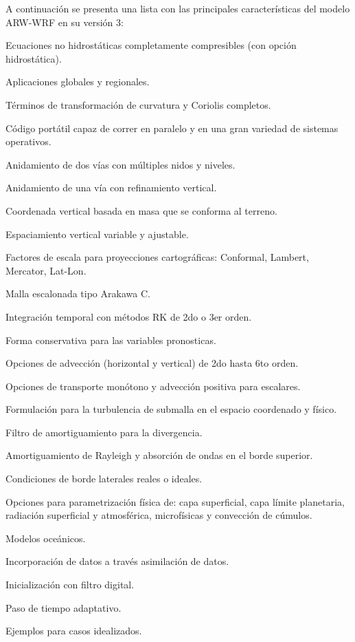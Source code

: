 A continuación se presenta una lista con las principales características del modelo ARW-WRF en su versión 3:
\begin{itemize*}
	\item Ecuaciones no hidrostáticas completamente compresibles (con opción hidrostática).
	\item Aplicaciones globales y regionales.
	\item Términos de transformación de curvatura y Coriolis completos.
	\item Código portátil capaz de correr en paralelo y en una gran variedad de sistemas operativos.
	\item Anidamiento de dos vías con múltiples nidos y niveles.
	\item Anidamiento de una vía con refinamiento vertical.
	\item Coordenada vertical basada en masa que se conforma al terreno.
	\item Espaciamiento vertical variable y ajustable.
	\item Factores de escala para proyecciones cartográficas: Conformal, Lambert, Mercator, Lat-Lon.
	\item Malla escalonada tipo Arakawa C.
	\item Integración temporal con métodos RK de 2do o 3er orden.
	\item Forma conservativa para las variables pronosticas.
	\item Opciones de advección (horizontal y vertical) de 2do hasta 6to orden.
	\item Opciones de transporte monótono y advección positiva para escalares.
	\item Formulación para la turbulencia de submalla en el espacio coordenado y físico.
	\item Filtro de amortiguamiento para la divergencia.
	\item Amortiguamiento de Rayleigh y absorción de ondas en el borde superior.
	\item Condiciones de borde laterales reales o ideales.
	\item Opciones para parametrización física de: capa superficial, capa límite planetaria, radiación superficial y atmosférica, microfísicas y convección de cúmulos.
	\item Modelos oceánicos.
	\item Incorporación de datos a través asimilación de datos.
	\item Inicialización con filtro digital.
	\item Paso de tiempo adaptativo.
	\item Ejemplos para casos idealizados.
\end{itemize*}

